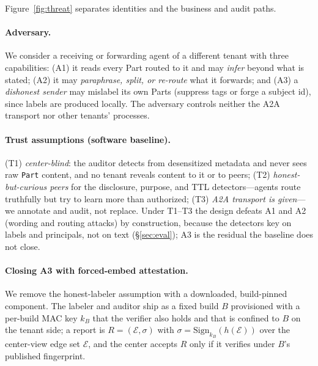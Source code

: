 \documentclass[sigconf,anonymous,review]{acmart}
\theoremstyle{acmplain}
\begin{document}
Figure~\ref{fig:threat} separates identities and the business and audit paths.


\paragraph{Adversary.} We consider a receiving or forwarding agent of a different
tenant with three capabilities: (A1) it reads every Part routed to it and may
\emph{infer} beyond what is stated; (A2) it may \emph{paraphrase, split, or re-route}
what it forwards; and (A3) a \emph{dishonest sender} may mislabel its own Parts
(suppress tags or forge a subject id), since labels are produced locally. The
adversary controls neither the A2A transport nor other tenants' processes.

\paragraph{Trust assumptions (software baseline).} (T1) \emph{center-blind}: the
auditor detects from desensitized metadata and never sees raw \texttt{Part} content,
and no tenant reveals content to it or to peers; (T2) \emph{honest-but-curious peers}
for the disclosure, purpose, and TTL detectors---agents route truthfully but try to
learn more than authorized; (T3) \emph{A2A transport is given}---we annotate and
audit, not replace. Under T1--T3 the design defeats A1 and A2 (wording and routing
attacks) by construction, because the detectors key on labels and principals, not on
text (\S\ref{sec:eval}); A3 is the residual the baseline does not close.

\paragraph{Closing A3 with forced-embed attestation.} We remove the honest-labeler
assumption with a downloaded, build-pinned component. The labeler and auditor ship as a fixed build $B$ provisioned with a per-build MAC key $k_B$ that the verifier also holds and that is confined to $B$ on the tenant side; a report is
$R=(\mathcal{E},\sigma)$ with $\sigma=\mathrm{Sign}_{k_B}(h(\mathcal{E}))$ over the
center-view edge set $\mathcal{E}$, and the center accepts $R$ only if it verifies
under $B$'s published fingerprint.
\end{document}
